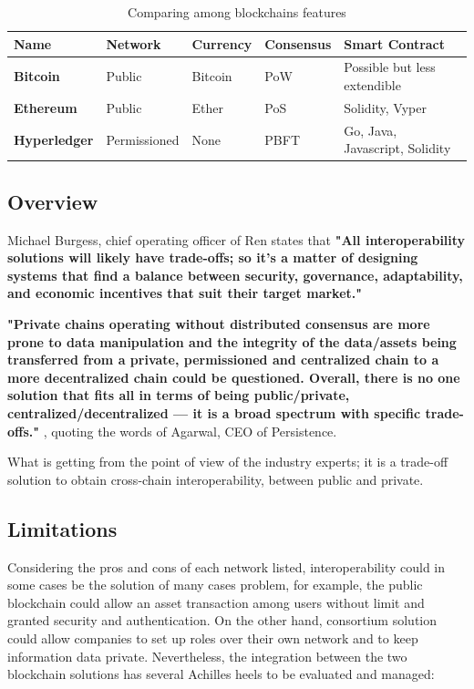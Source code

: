 \begin{table}[h]
    {\renewcommand\arraystretch{1.25}
    \begin{tabular}{|l|l|l|l|l|} \hline
    \textbf{Name} & \textbf{Network} & \textbf{Currency} & \textbf{Consensus} & \textbf{Smart Contract}\\ \hline\hline
    \textbf{Bitcoin} & Public & Bitcoin & PoW & Possible but less extendible\\ \hline
    \textbf{Ethereum} & Public & Ether & PoS & Solidity, Vyper\\ \hline
    \textbf{Hyperledger} & Permissioned & None & PBFT & Go, Java, Javascript, Solidity\\ \hline
    \end{tabular}}
    \caption{Comparing among blockchains features}
    \label{table-compare-blockchains}
\end{table}

\subsection{Overview}

Michael Burgess, chief operating officer of Ren states that \textbf{"All interoperability solutions will 
likely have trade-offs; so it's a matter of designing systems that find a balance between security, 
governance, adaptability, and economic incentives that suit their target market."}
\bigskip

\textbf{"Private chains operating without distributed consensus are more prone to data manipulation 
and the integrity of the data/assets being transferred from a private, permissioned and centralized 
chain to a more decentralized chain could be questioned. Overall, there is no one solution that fits 
all in terms of being public/private, centralized/decentralized — it is a broad spectrum with specific 
trade-offs."}\cite{interoperability1}
, quoting the words of Agarwal, CEO of Persistence.
\bigskip

What is getting from the point of view of the industry experts; it is a trade-off solution to obtain cross-chain 
interoperability, between public and private.

\subsection{Limitations}

Considering the pros and cons of each network listed, interoperability could in some cases be the 
solution of many cases problem, for example, the public blockchain could allow an asset transaction among 
users without limit and granted security and authentication. On the other hand, consortium solution could 
allow companies to set up roles over their own network and to keep information data private. Nevertheless, 
the integration between the two blockchain solutions has several Achilles heels to be evaluated and managed:



